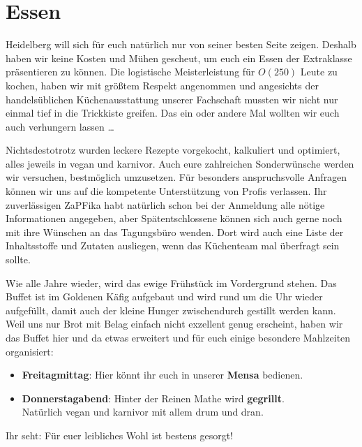 
\section{Essen}
Heidelberg will sich für euch natürlich nur von seiner besten Seite zeigen. Deshalb haben wir keine Kosten und Mühen gescheut,  um euch ein Essen der Extraklasse präsentieren zu können. Die logistische Meisterleistung für $O(250)$ Leute zu kochen, haben wir mit größtem Respekt angenommen und angesichts der handelsüblichen Küchenausstattung unserer Fachschaft mussten wir nicht nur einmal tief in die Trickkiste greifen. Das ein oder andere Mal wollten wir euch auch verhungern lassen \dots

Nichtsdestotrotz wurden leckere Rezepte vorgekocht, kalkuliert und optimiert, alles jeweils in vegan und karnivor.  Auch eure zahlreichen Sonderwünsche werden wir versuchen, bestmöglich umzusetzen. Für besonders anspruchsvolle Anfragen können wir uns auf die kompetente Unterstützung von Profis verlassen. Ihr zuverlässigen ZaPFika habt natürlich schon bei der Anmeldung alle nötige Informationen angegeben, aber Spätentschlossene können sich auch gerne noch mit ihre Wünschen an das Tagungsbüro wenden. Dort wird auch eine Liste der Inhaltsstoffe und Zutaten ausliegen, wenn das Küchenteam mal überfragt sein sollte.

Wie alle Jahre wieder, wird das ewige Frühstück im Vordergrund stehen. Das Buffet ist im Goldenen Käfig aufgebaut und wird rund um die Uhr wieder aufgefüllt, damit auch der kleine Hunger zwischendurch gestillt werden kann. Weil uns nur Brot mit Belag einfach nicht exzellent genug erscheint, haben wir das Buffet hier und da etwas erweitert und für euch einige besondere Mahlzeiten organisiert:
  \begin{itemize}
    \item \textbf{Freitagmittag}: Hier könnt ihr euch in unserer \textbf{Mensa} bedienen.
    \item \textbf{Donnerstagabend}: Hinter der Reinen Mathe wird \textbf{gegrillt}. \\
      Natürlich vegan und karnivor mit allem drum und dran.
  \end{itemize}
  Ihr seht: Für euer leibliches Wohl ist bestens gesorgt! \\

